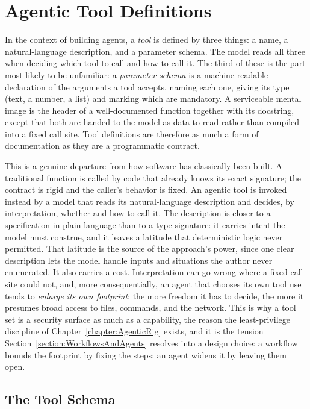 \section{Agentic Tool Definitions}
\label{section:ToolDefinitions}

In the context of building agents, a \emph{tool} is defined by three things: a name, a natural-language description, and a parameter schema.
The model reads all three when deciding which tool to call and how to call it.
The third of these is the part most likely to be unfamiliar: a \emph{parameter schema} is a machine-readable declaration of the arguments a tool accepts, naming each one, giving its type (text, a number, a list) and marking which are mandatory.
A serviceable mental image is the header of a well-documented function together with its docstring, except that both are handed to the model as data to read rather than compiled into a fixed call site.
Tool definitions are therefore as much a form of documentation as they are a programmatic contract.

This is a genuine departure from how software has classically been built.
A traditional function is called by code that already knows its exact signature; the contract is rigid and the caller's behavior is fixed.
An agentic tool is invoked instead by a model that reads its natural-language description and decides, by interpretation, whether and how to call it.
The description is closer to a specification in plain language than to a type signature: it carries intent the model must construe, and it leaves a latitude that deterministic logic never permitted.
That latitude is the source of the approach's power, since one clear description lets the model handle inputs and situations the author never enumerated.
It also carries a cost.
Interpretation can go wrong where a fixed call site could not, and, more consequentially, an agent that chooses its own tool use tends to \emph{enlarge its own footprint}: the more freedom it has to decide, the more it presumes broad access to files, commands, and the network.
This is why a tool set is a security surface as much as a capability, the reason the least-privilege discipline of Chapter~\ref{chapter:AgenticRig} exists, and it is the tension Section~\ref{section:WorkflowsAndAgents} resolves into a design choice: a workflow bounds the footprint by fixing the steps; an agent widens it by leaving them open.

\subsection{The Tool Schema}

